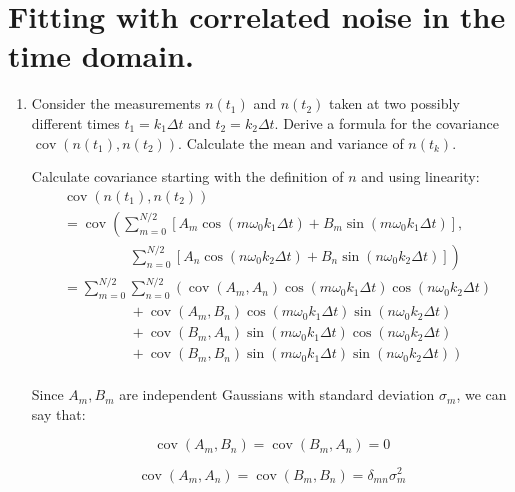 \section{Fitting with correlated noise in the time domain.}

\begin{enumerate}[label=\textbf{\Alph*}.]
    \item Consider the measurements $n(t_1)$ and $n(t_2)$ taken at two possibly different
    times $t_1 = k_1\Delta t$ and $t_2 = k_2\Delta t$. Derive a formula for the covariance
    $\operatorname{cov}(n(t_1), n(t_2))$. Calculate the mean and variance of $n(t_k)$.

    Calculate covariance starting with the definition of $n$ and using linearity:
    \begin{align*}
        &\operatorname{cov}(n(t_1), n(t_2)) \\
        &= \operatorname{cov}\left(\sum_{m=0}^{N/2}[A_m\cos(m\omega_0 k_1\Delta t) + B_m \sin(m\omega_0 k_1\Delta t)],\right. \\
        &\hspace{2cm}\left.\sum_{n=0}^{N/2}[A_n\cos(n\omega_0 k_2\Delta t) + B_n \sin(n\omega_0 k_2\Delta t)]\right) \\
        &= \sum_{m=0}^{N/2} \sum_{n=0}^{N/2} \left(\operatorname{cov}(A_m, A_n)\cos(m\omega_0 k_1\Delta t)\cos(n\omega_0 k_2\Delta t)\right. \\
        &\hspace{2cm}+ \operatorname{cov}(A_m, B_n)\cos(m\omega_0 k_1\Delta t)\sin(n\omega_0 k_2\Delta t) \\
        &\hspace{2cm}+\operatorname{cov}(B_m, A_n) \sin(m\omega_0 k_1\Delta t)\cos(n\omega_0 k_2\Delta t) \\
        &\hspace{2cm}+\left.\operatorname{cov}(B_m, B_n) \sin(m\omega_0 k_1\Delta t)\sin(n\omega_0 k_2\Delta t)\right) \\
    \end{align*}

    Since $A_m, B_m$ are independent Gaussians with standard deviation $\sigma_m$, we can say that:

    $$\operatorname{cov}(A_m, B_n) = \operatorname{cov}(B_m, A_n) = 0$$

    $$\operatorname{cov}(A_m, A_n) = \operatorname{cov}(B_m, B_n) = \delta_{mn}\sigma_m^2$$


\end{enumerate}
